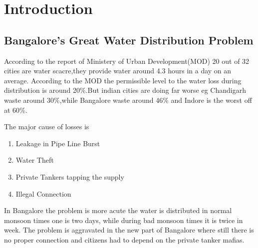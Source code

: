 \documentclass[12pt]{iiscthes}
\begin{document}
\begin{frontmatter}
\makecontents




\end{frontmatter}
\chapter{Introduction}

\section{Bangalore's Great Water Distribution Problem}
	According to the report of Ministery of Urban Development(MOD) 20 out of 32 cities are water scacre,they provide water around 4.3 hours in a day on an average.
	According to the MOD the permissible level to the water loss during distribution is around 20\%.But indian cities are doing far worse eg
	Chandigarh waste around 30\%,while Bangalore waste around 46\% and Indore is
	the worst off at 60\%.
	
	The major cause of losses is
	\begin{enumerate}
		\item Leakage in Pipe Line Burst
		\item Water Theft
		\item Private Tankers tapping the supply
		\item Illegal Connection
	\end{enumerate}
	
    In Bangalore the problem is more acute the water is distributed in normal monsoon times one is two days, while during bad monsoon times it is twice in week.
    The problem is aggravated in the new part of Bangalore where still there is no
    proper connection and citizens had to depend on the private tanker mafias.
    
\end{document}

